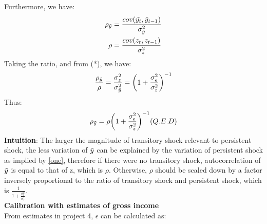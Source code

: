\documentclass[12pt,a4paper]{article}
\begin{document}
Furthermore, we have:
\begin{align*}
    \rho_{\Tilde{y}}&=\frac{cov(\Tilde{y_t},\Tilde{y}_{t-1})}{ \sigma^2_{\Tilde{y}}}\\
    \rho&=\frac{cov(z_t,z_{t-1})}{ \sigma^2_z}\\
\end{align*}
Taking the ratio, and from (*), we have:
\begin{equation*}
  \frac{\rho_{\Tilde{y}}}{\rho}=\frac{\sigma^2_z}{\sigma^2_{\Tilde{y}}} =\bigg(1+\frac{\sigma^2_\epsilon}{\sigma^2_z}\bigg)^{-1}
\end{equation*}
Thus:
\begin{equation*}
\rho_{\Tilde{y}}=\rho\bigg(1+\frac{\sigma^2_\epsilon}{\sigma^2_z}\bigg)^{-1}(Q.E.D)
\end{equation*}
\textbf{Intuition}: The larger the magnitude of transitory shock relevant to persistent shock, the less variation of $\Tilde{y}$ can be explained by the variation of persistent shock as implied by \eqref{one}, therefore if there were no transitory shock, autocorrelation of $\Tilde{y}$ is equal to that of z, which is $\rho$. Otherwise, $\rho$ should be scaled down by a factor inversely proportional to the ratio of transitory shock and persistent shock, which is $\frac{1}{1+\frac{\sigma^2_\epsilon}{\sigma^2_z}}$. \\

\textbf{Calibration with estimates of gross income} \\

From estimates in project 4, $\epsilon$ can be calculated as:
\end{document}
